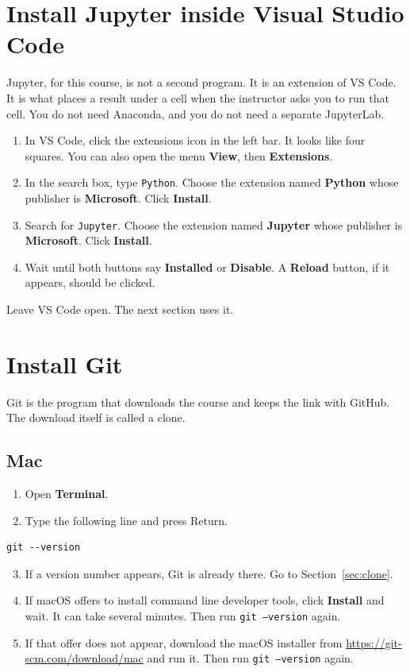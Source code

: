 \documentclass[11pt,a4paper]{article}
\newcommand{\menu}[1]{\textbf{#1}}
\newcommand{\cmd}[1]{\texttt{#1}}
\begin{document}
\section{Install Jupyter inside Visual Studio Code}

Jupyter, for this course, is not a second program. It is an extension of VS Code. It is what places a result under a cell when the instructor asks you to run that cell. You do not need Anaconda, and you do not need a separate JupyterLab.

\begin{enumerate}
\item In VS Code, click the extensions icon in the left bar. It looks like four squares. You can also open the menu \menu{View}, then \menu{Extensions}.
\item In the search box, type \cmd{Python}. Choose the extension named \textbf{Python} whose publisher is \textbf{Microsoft}. Click \menu{Install}.
\item Search for \cmd{Jupyter}. Choose the extension named \textbf{Jupyter} whose publisher is \textbf{Microsoft}. Click \menu{Install}.
\item Wait until both buttons say \menu{Installed} or \menu{Disable}. A \menu{Reload} button, if it appears, should be clicked.
\end{enumerate}

Leave VS Code open. The next section uses it.

\section{Install Git}

Git is the program that downloads the course and keeps the link with GitHub. The download itself is called a clone.

\subsection{Mac}

\begin{enumerate}
\item Open \menu{Terminal}.
\item Type the following line and press Return.
\end{enumerate}

\begin{verbatim}
git --version
\end{verbatim}

\begin{enumerate}
\setcounter{enumi}{2}
\item If a version number appears, Git is already there. Go to Section~\ref{sec:clone}.
\item If macOS offers to install command line developer tools, click \menu{Install} and wait. It can take several minutes. Then run \cmd{git --version} again.
\item If that offer does not appear, download the macOS installer from \url{https://git-scm.com/download/mac} and run it. Then run \cmd{git --version} again.
\end{enumerate}
\end{document}
